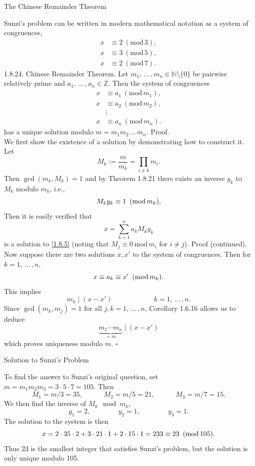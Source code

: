 \documentclass[smaller,hyperref={CJKbookmarks=true}]{beamer}
\newcommand{\N}{\mathbb{N}} \newcommand{\Z}{\mathbb{Z}} \newcommand{\Q}{\mathbb{Q}}
\newenvironment{PROOF}{{\noindent\!\sf\alert{Proof.}}\\}{\hfill$\square$\\}
\newcounter{zhuo}[subsection]
\begin{document}
\begin{frame}{The Chinese Remainder Theorem}
\begin{spacing}{1}
Sunzi's problem can be written in modern mathematical notation as a system of congruences,
\begin{align*}
  x &\equiv2\:(\text{mod}\,3),  \\
  x &\equiv3\:(\text{mod}\,5),  \\
  x &\equiv2\:(\text{mod}\,7).
\end{align*}
\alert{1.8.24. Chinese Remainder Theorem.} Let $m_1,\,...\,,m_n\in\N\setminus\{0\}$ be pairwise relatively prime and $a_1,\,...\,,a_n\in\Z$. Then the system of congruences
\begin{equation}\label{1.8.5}
\begin{aligned}
  x &\equiv a_1\:(\text{mod}\,m_1), \\
  x &\equiv a_2\:(\text{mod}\,m_2), \\
    &\vdots \\
  x &\equiv a_n\:(\text{mod}\,m_n).
\end{aligned}
\end{equation}
has a unique solution modulo $m=m_1m_2\,...\,m_n$.
\newpage
\begin{PROOF}
We first show the existence of a solution by demonstrating how to construct it. Let
\[M_k:=\frac{m}{m_k}=\prod_{i\neq k}m_i.\]
Then $\gcd(m_k,M_k)=1$ and by Theorem 1.8.21 there exists an inverse $y_k$ to $M_k$ modulo $m_k$, i.e.,
\[M_ky_k\equiv1\enskip(\text{mod}\,m_k),\]
Then it is easily verified that
\[x=\sum_{k=1}^{n}a_kM_ky_k\]
is a solution to \eqref{1.8.5} (noting that $M_j\equiv0~\text{mod}\,m_i$ for $i\neq j$).
\newpage
\alert{Proof (continued).}\\
Now suppose there are two solutions $x,x'$ to the system of congruences. Then for $k=1,\,...\,,n,$
\[x\equiv a_k\equiv x'\enskip(\text{mod}\,m_k).\]
This implies
\[m_k\mid(x-x')\qquad\qquad\qquad
k=1,\,...\,,n.\]
Since $\gcd(m_k,m_j)=1$ for all $j,k=1,\,...\,,n$, Corollary 1.6.16 allows us to deduce
\[\underbrace{m_1\cdots m_n}_{=m}\mid(x-x')\]
which proves uniqueness modulo $m$.
\end{PROOF}
\end{spacing}
\end{frame}
\begin{frame}[t]{Solution to Sunzi's Problem}
\begin{spacing}{1.1}
To find the answer to Sunzi's original question, set\\[4pt]
$m=m_1m_2m_3=3\cdot 5\cdot 7=105$. Then
\[M_1=m/3=35,\qquad\quad M_2=m/5=21,\qquad\quad M_3=m/7=15.\]
We then find the inverse of $M_k\mod m_k$,
\[y_1=2,\qquad\qquad y_2=1,\qquad\qquad
y_3=1.\]
The solution to the system is then
\[x=2\cdot35\cdot2+3\cdot21\cdot1+2\cdot15\cdot1=233
\equiv23\enskip(\text{mod}\,105).\]
Thus 23 is the smallest integer that satisfies Sunzi's problem, but the solution is only unique modulo 105.
\end{spacing}
\end{frame}
\end{document}
